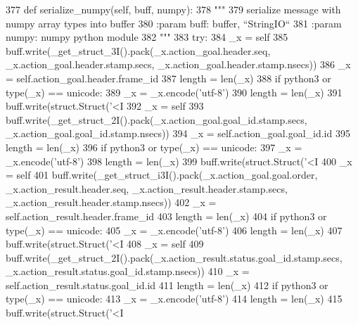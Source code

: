 \begin{DoxyCode}
377   \textcolor{keyword}{def }serialize\_numpy(self, buff, numpy):
378     \textcolor{stringliteral}{"""}
379 \textcolor{stringliteral}{    serialize message with numpy array types into buffer}
380 \textcolor{stringliteral}{    :param buff: buffer, ``StringIO``}
381 \textcolor{stringliteral}{    :param numpy: numpy python module}
382 \textcolor{stringliteral}{    """}
383     \textcolor{keywordflow}{try}:
384       \_x = self
385       buff.write(\_get\_struct\_3I().pack(\_x.action\_goal.header.seq, \_x.action\_goal.header.stamp.secs, 
      \_x.action\_goal.header.stamp.nsecs))
386       \_x = self.action\_goal.header.frame\_id
387       length = len(\_x)
388       \textcolor{keywordflow}{if} python3 \textcolor{keywordflow}{or} type(\_x) == unicode:
389         \_x = \_x.encode(\textcolor{stringliteral}{'utf-8'})
390         length = len(\_x)
391       buff.write(struct.Struct(\textcolor{stringliteral}{'<I%
392       \_x = self
393       buff.write(\_get\_struct\_2I().pack(\_x.action\_goal.goal\_id.stamp.secs, 
      \_x.action\_goal.goal\_id.stamp.nsecs))
394       \_x = self.action\_goal.goal\_id.id
395       length = len(\_x)
396       \textcolor{keywordflow}{if} python3 \textcolor{keywordflow}{or} type(\_x) == unicode:
397         \_x = \_x.encode(\textcolor{stringliteral}{'utf-8'})
398         length = len(\_x)
399       buff.write(struct.Struct(\textcolor{stringliteral}{'<I%
400       \_x = self
401       buff.write(\_get\_struct\_i3I().pack(\_x.action\_goal.goal.order, \_x.action\_result.header.seq, 
      \_x.action\_result.header.stamp.secs, \_x.action\_result.header.stamp.nsecs))
402       \_x = self.action\_result.header.frame\_id
403       length = len(\_x)
404       \textcolor{keywordflow}{if} python3 \textcolor{keywordflow}{or} type(\_x) == unicode:
405         \_x = \_x.encode(\textcolor{stringliteral}{'utf-8'})
406         length = len(\_x)
407       buff.write(struct.Struct(\textcolor{stringliteral}{'<I%
408       \_x = self
409       buff.write(\_get\_struct\_2I().pack(\_x.action\_result.status.goal\_id.stamp.secs, 
      \_x.action\_result.status.goal\_id.stamp.nsecs))
410       \_x = self.action\_result.status.goal\_id.id
411       length = len(\_x)
412       \textcolor{keywordflow}{if} python3 \textcolor{keywordflow}{or} type(\_x) == unicode:
413         \_x = \_x.encode(\textcolor{stringliteral}{'utf-8'})
414         length = len(\_x)
415       buff.write(struct.Struct(\textcolor{stringliteral}{'<I%
}}}}
\end{DoxyCode}
